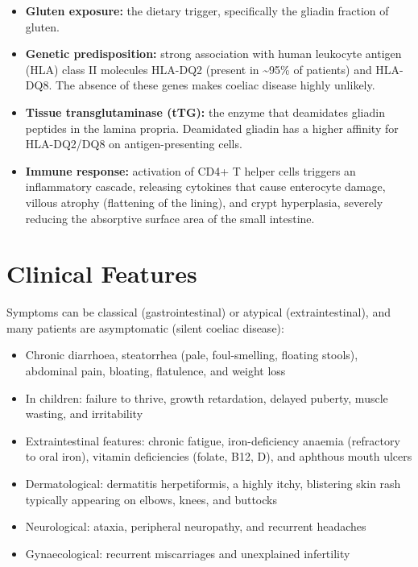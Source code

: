 \begin{itemize}
    \item \textbf{Gluten exposure:} the dietary trigger, specifically the gliadin fraction of gluten.
    \item \textbf{Genetic predisposition:} strong association with human leukocyte antigen (HLA) class II molecules HLA-DQ2 (present in \textasciitilde{}95\% of patients) and HLA-DQ8. The absence of these genes makes coeliac disease highly unlikely.
    \item \textbf{Tissue transglutaminase (tTG):} the enzyme that deamidates gliadin peptides in the lamina propria. Deamidated gliadin has a higher affinity for HLA-DQ2/DQ8 on antigen-presenting cells.
    \item \textbf{Immune response:} activation of CD4+ T helper cells triggers an inflammatory cascade, releasing cytokines that cause enterocyte damage, villous atrophy (flattening of the lining), and crypt hyperplasia, severely reducing the absorptive surface area of the small intestine.
\end{itemize}

\section*{Clinical Features}
Symptoms can be classical (gastrointestinal) or atypical (extraintestinal), and many patients are asymptomatic (silent coeliac disease):

\begin{itemize}
    \item Chronic diarrhoea, steatorrhea (pale, foul-smelling, floating stools), abdominal pain, bloating, flatulence, and weight loss
    \item In children: failure to thrive, growth retardation, delayed puberty, muscle wasting, and irritability
    \item Extraintestinal features: chronic fatigue, iron-deficiency anaemia (refractory to oral iron), vitamin deficiencies (folate, B12, D), and aphthous mouth ulcers
    \item Dermatological: dermatitis herpetiformis, a highly itchy, blistering skin rash typically appearing on elbows, knees, and buttocks
    \item Neurological: ataxia, peripheral neuropathy, and recurrent headaches
    \item Gynaecological: recurrent miscarriages and unexplained infertility
\end{itemize}

